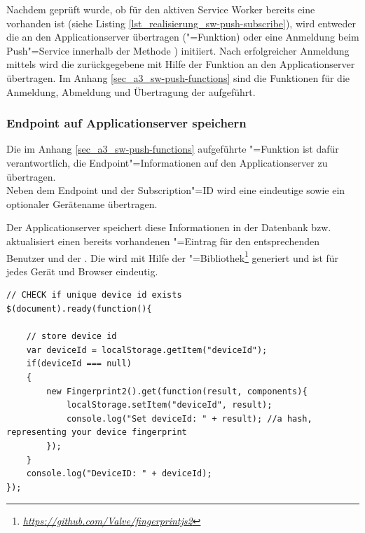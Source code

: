 Nachdem geprüft wurde, ob für den aktiven Service Worker bereits eine  vorhanden ist (siehe Listing \ref{lst_realisierung_sw-push-subscribe}), wird entweder die  an den Applicationserver übertragen ("=Funktion) oder eine Anmeldung beim Push"=Service innerhalb der Methode ) initiiert. 
Nach erfolgreicher Anmeldung mittels  wird die zurückgegebene  mit Hilfe der Funktion  an den Applicationserver übertragen. Im Anhang \ref{sec_a3_sw-push-functions} sind die Funktionen für die Anmeldung, Abmeldung und Übertragung der  aufgeführt.

\newpage
\subsubsection{Endpoint auf Applicationserver speichern}

Die im Anhang \ref{sec_a3_sw-push-functions} aufgeführte "=Funktion ist dafür verantwortlich, die Endpoint"=Informationen auf den Applicationserver zu übertragen. \\
Neben dem Endpoint und der Subscription"=ID wird eine eindeutige  sowie ein optionaler Gerätename übertragen. 

Der Applicationserver speichert diese Informationen in der Datenbank bzw. aktualisiert einen bereits vorhandenen "=Eintrag für den entsprechenden Benutzer und der . Die  wird mit Hilfe der "=Bibliothek\footnote{\textit{\url{https://github.com/Valve/fingerprintjs2}}} generiert und ist für jedes Gerät und Browser eindeutig. \\ 

\begin{lstlisting}[caption={Bei Seitenstart prüfen, ob eine DeviceID vorhanden ist und ggf. anlegen},label={lst_realisierung_deviceId}, frame=single]
// CHECK if unique device id exists
$(document).ready(function(){

    // store device id
    var deviceId = localStorage.getItem("deviceId");
    if(deviceId === null)
    {
        new Fingerprint2().get(function(result, components){
            localStorage.setItem("deviceId", result);
            console.log("Set deviceId: " + result); //a hash, representing your device fingerprint
        });
    }
    console.log("DeviceID: " + deviceId);
});
\end{lstlisting}

